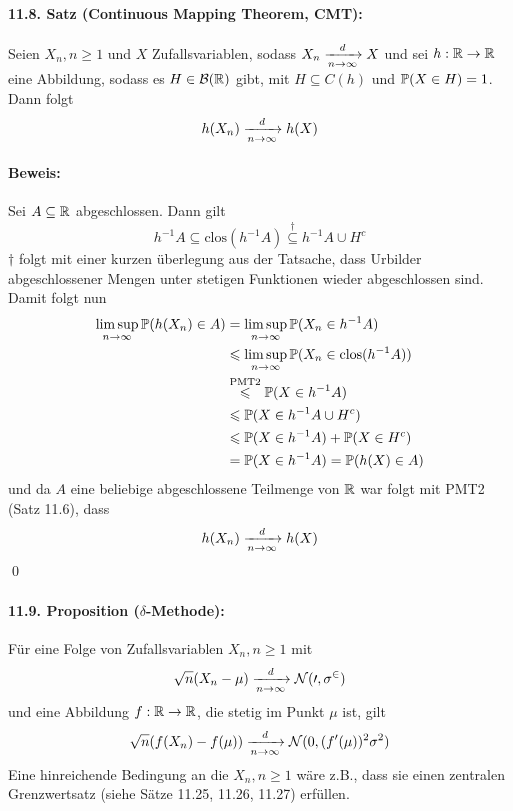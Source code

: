 \paragraph{11.8. Satz (Continuous Mapping Theorem, CMT):} Seien $X_n,n\geq 1$ und $X$ Zufallsvariablen, sodass $X_n\nto{d}{n\to\infty}X$ und sei $h:\mathbb{R}\to\mathbb{R}$ eine Abbildung, sodass es $H\in\mathcal{B}(\mathbb{R})$ gibt, mit $H\subseteq C(h)$ und $\mathbb{P}(X\in H)=1$. Dann folgt
$$h(X_n)\nto{d}{n\to\infty}h(X)$$

\paragraph{Beweis:} Sei $A\subseteq\mathbb{R}$ abgeschlossen. Dann gilt
$$h^{-1}A\subseteq\text{clos}(h^{-1}A)\overset{\dag}{\subseteq}h^{-1}A\cup H^c$$
$\dag$ folgt mit einer kurzen \"uberlegung aus der Tatsache, dass Urbilder abgeschlossener Mengen unter stetigen Funktionen wieder abgeschlossen sind. \newline\newline
Damit folgt nun
\begin{align*}
    \limsup_{n\to\infty}\mathbb{P}(h(X_n)\in A)&=\limsup_{n\to\infty}\mathbb{P}(X_n\in h^{-1}A)\\
    &\leqslant \limsup_{n\to\infty}\mathbb{P}(X_n\in\text{clos}(h^{-1}A))\\
    &\overset{\text{PMT2}}{\leqslant}\mathbb{P}(X\in h^{-1}A) \\
    &\leqslant\mathbb{P}(X\in h^{-1}A\cup H^c)\\
    &\leqslant\mathbb{P}(X\in h^{-1}A)+\mathbb{P}(X\in H^c)\\
    &=\mathbb{P}(X\in h^{-1}A)=\mathbb{P}(h(X)\in A)
\end{align*}
und da $A$ eine beliebige abgeschlossene Teilmenge von $\mathbb{R}$ war folgt mit PMT2 (Satz 11.6), dass
$$h(X_n)\nto{d}{n\to\infty}h(X)$$
\qed

\paragraph{11.9. Proposition ($\delta$-Methode):} F\"ur eine Folge von Zufallsvariablen $X_n,n\geq1$ mit $$\sqrt{n}(X_n-\mu)\nto{d}{n\to\infty}\mathcal{N(0,\sigma^2)}$$
und eine Abbildung $f:\mathbb{R}\to\mathbb{R}$, die stetig im Punkt $\mu$ ist, gilt
$$\sqrt{n}(f(X_n)-f(\mu))\nto{d}{n\to\infty}\mathcal{N}(0,(f'(\mu))^2\sigma^2)$$
Eine hinreichende Bedingung an die $X_n,n\geq1$ w\"are z.B., dass sie einen zentralen Grenzwertsatz (siehe S\"atze 11.25, 11.26, 11.27) erf\"ullen.

